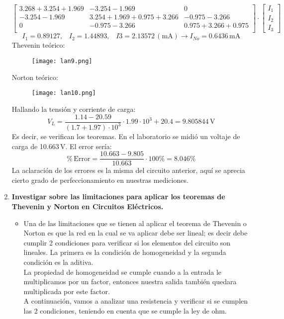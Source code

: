 \documentclass[a4paper,11pt]{report}
\begin{document}
\begin{enumerate}[label=\arabic*),font=\bfseries]
$$\begin{bmatrix}
3.268+3.254+1.969 & -3.254-1.969 & 0 \\
-3.254-1.969 & 3.254+1.969+0.975+3.266 & -0.975-3.266 \\
0 & -0.975-3.266 & 0.975+3.266+0.975 \\
\end{bmatrix} \cdot \begin{bmatrix}
I_{1} \\
I_{2} \\
I_{3}
\end{bmatrix}
$$
$$
I_{1} = 0.89127, \hspace{10pt} I_{2} = 1.44893, \hspace{10pt} I{3} = 2.13572 \, (\mathrm{mA}) \longrightarrow I_{No} = 0.6436\,\mathrm{mA}
$$
Thevenin teórico:
\begin{figure}[H]
\centering
\texttt{[image: lan9.png]}
\end{figure}
Norton teórico:
\begin{figure}[H]
\centering
\texttt{[image: lan10.png]}
\end{figure}
Hallando la tensión y corriente de carga:
$$
V_{L} = \frac{1.14-20.59}{(1.7+1.97)\cdot 10^{3}}\cdot 1.99\cdot 10^{3} + 20.4 = 9.805844\,\mathrm{V}
$$
Es decir, se verifican los teoremas. En el laboratorio se midió un voltaje de carga de 10.663\,V. El error sería:
$$
\%\,\mathrm{Error} = \frac{10.663-9.805}{10.663}\cdot 100\% = 8.046\%
$$
La aclaración de los errores es la misma del circuito anterior, aquí se aprecia cierto grado de perfeccionamiento en nuestras mediciones.
\item \textbf{Investigar sobre las limitaciones para aplicar los teoremas de Thevenin y Norton en Circuitos Eléctricos.}\\
\begin{itemize}
\item Una de las limitaciones que se tienen al aplicar el teorema de Thevenin o Norton es que la red en la cual se va aplicar debe ser lineal; es decir debe cumplir 2 condiciones para verificar si los elementos del circuito son lineales. La primera es la condición de homogeneidad y la segunda condición es la aditiva.\\
La propiedad de homogeneidad se cumple cuando a la entrada le multiplicamos por un factor, entonces nuestra salida también quedara multiplicada por este factor.\\
A continuación, vamos a analizar una resistencia y verificar si se cumplen las 2 condiciones, teniendo en cuenta que se cumple la ley de ohm.
$$
$$
\end{itemize}
\end{enumerate}
\end{document}
